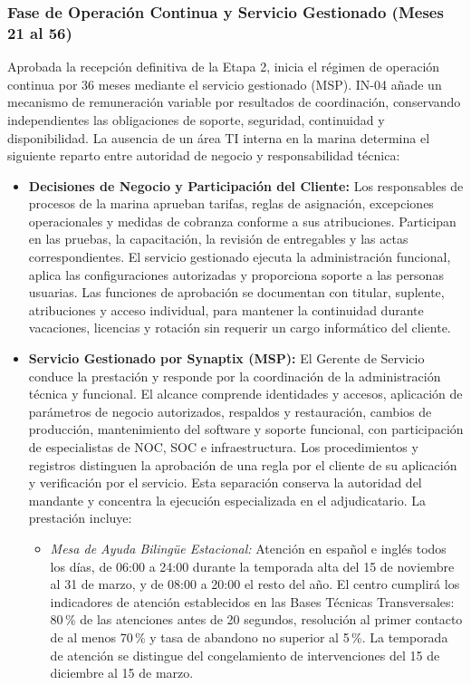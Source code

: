 \subsubsection{Fase de Operación Continua y Servicio Gestionado (Meses 21 al 56)}
Aprobada la recepción definitiva de la Etapa 2, inicia el régimen de operación continua por 36 meses mediante el servicio gestionado (MSP). IN-04 añade un mecanismo de remuneración variable por resultados de coordinación, conservando independientes las obligaciones de soporte, seguridad, continuidad y disponibilidad. La ausencia de un área TI interna en la marina determina el siguiente reparto entre autoridad de negocio y responsabilidad técnica:
\begin{itemize}
    \item \textbf{Decisiones de Negocio y Participación del Cliente:} Los responsables de procesos de la marina aprueban tarifas, reglas de asignación, excepciones operacionales y medidas de cobranza conforme a sus atribuciones. Participan en las pruebas, la capacitación, la revisión de entregables y las actas correspondientes. El servicio gestionado ejecuta la administración funcional, aplica las configuraciones autorizadas y proporciona soporte a las personas usuarias. Las funciones de aprobación se documentan con titular, suplente, atribuciones y acceso individual, para mantener la continuidad durante vacaciones, licencias y rotación sin requerir un cargo informático del cliente.
    \item \textbf{Servicio Gestionado por Synaptix (MSP):} El Gerente de Servicio conduce la prestación y responde por la coordinación de la administración técnica y funcional. El alcance comprende identidades y accesos, aplicación de parámetros de negocio autorizados, respaldos y restauración, cambios de producción, mantenimiento del software y soporte funcional, con participación de especialistas de NOC, SOC e infraestructura. Los procedimientos y registros distinguen la aprobación de una regla por el cliente de su aplicación y verificación por el servicio. Esta separación conserva la autoridad del mandante y concentra la ejecución especializada en el adjudicatario. La prestación incluye:
    \begin{itemize}
        \item \emph{Mesa de Ayuda Bilingüe Estacional:} Atención en español e inglés todos los días, de 06:00 a 24:00 durante la temporada alta del 15 de noviembre al 31 de marzo, y de 08:00 a 20:00 el resto del año. El centro cumplirá los indicadores de atención establecidos en las Bases Técnicas Transversales: 80\,\% de las atenciones antes de 20 segundos, resolución al primer contacto de al menos 70\,\% y tasa de abandono no superior al 5\,\%. La temporada de atención se distingue del congelamiento de intervenciones del 15 de diciembre al 15 de marzo.

\end{itemize}
\end{itemize}
